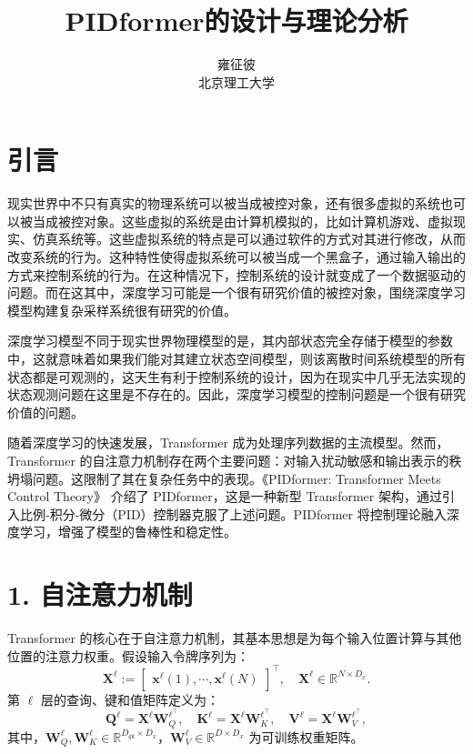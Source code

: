 \documentclass[lang=cn,a4paper,newtx]{elegantpaper}
\title{PIDformer的设计与理论分析}
\author{雍征彼 \\ 北京理工大学}
\date{\zhdate{2024/11/18}}
\begin{document}
\maketitle

\section*{引言}
现实世界中不只有真实的物理系统可以被当成被控对象，还有很多虚拟的系统也可以被当成被控对象。这些虚拟的系统是由计算机模拟的，比如计算机游戏、虚拟现实、仿真系统等。这些虚拟系统的特点是可以通过软件的方式对其进行修改，从而改变系统的行为。这种特性使得虚拟系统可以被当成一个黑盒子，通过输入输出的方式来控制系统的行为。在这种情况下，控制系统的设计就变成了一个数据驱动的问题。而在这其中，深度学习可能是一个很有研究价值的被控对象，围绕深度学习模型构建复杂采样系统很有研究的价值。

深度学习模型不同于现实世界物理模型的是，其内部状态完全存储于模型的参数中，这就意味着如果我们能对其建立状态空间模型，则该离散时间系统模型的所有状态都是可观测的，这天生有利于控制系统的设计，因为在现实中几乎无法实现的状态观测问题在这里是不存在的。因此，深度学习模型的控制问题是一个很有研究价值的问题。

随着深度学习的快速发展，Transformer 成为处理序列数据的主流模型。然而，Transformer 的自注意力机制存在两个主要问题：对输入扰动敏感和输出表示的秩坍塌问题。这限制了其在复杂任务中的表现。《PIDformer: Transformer Meets Control Theory》\cite{nguyenPIDformerTransformerMeets2024} 介绍了 PIDformer，这是一种新型 Transformer 架构，通过引入比例-积分-微分（PID）控制器克服了上述问题。PIDformer 将控制理论融入深度学习，增强了模型的鲁棒性和稳定性。

\section*{1. 自注意力机制}

Transformer 的核心在于自注意力机制，其基本思想是为每个输入位置计算与其他位置的注意力权重。假设输入令牌序列为：
\[
\mathbf{X}^\ell := \begin{bmatrix}
\mathbf{x}^\ell(1), \cdots, \mathbf{x}^\ell(N)
\end{bmatrix}^\top, \quad \mathbf{X}^\ell \in \mathbb{R}^{N \times D_x}.
\]
第 $\ell$ 层的查询、键和值矩阵定义为：
\[
\mathbf{Q}^\ell = \mathbf{X}^\ell \mathbf{W}_Q^{\ell^\top}, \quad
\mathbf{K}^\ell = \mathbf{X}^\ell \mathbf{W}_K^{\ell^\top}, \quad
\mathbf{V}^\ell = \mathbf{X}^\ell \mathbf{W}_V^{\ell^\top},
\]
其中，$\mathbf{W}_Q^\ell, \mathbf{W}_K^\ell \in \mathbb{R}^{D_{qk} \times D_x}$，$\mathbf{W}_V^\ell \in \mathbb{R}^{D \times D_x}$ 为可训练权重矩阵。
\end{document}
